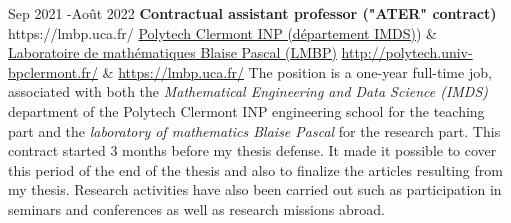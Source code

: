 \documentclass[10pt]{article} %
\begin{document}
\job
{Sep 2021 -}{Août 2022}
{\textbf{Contractual assistant professor ("ATER" contract)}}
{https://lmbp.uca.fr/}
{\href{http://polytech.univ-bpclermont.fr/}{Polytech Clermont INP (département IMDS)}) \&   \href{https://lmbp.uca.fr/}{Laboratoire de mathématiques Blaise Pascal  (LMBP)}}
{\href{http://polytech.univ-bpclermont.fr/}{http://polytech.univ-bpclermont.fr/}     \&   \href{https://lmbp.uca.fr/}{https://lmbp.uca.fr/}  }
{ The position is a one-year full-time job,  associated with both the \textit{Mathematical Engineering and Data Science (IMDS)} department of the Polytech Clermont INP engineering school for the teaching part and the \textit{laboratory of mathematics Blaise Pascal}  for the research part.
	This contract started 3 months before my thesis defense. It made it possible to cover this period of the end of the thesis and also to finalize the articles resulting from my thesis. Research activities have also been carried out such as participation in seminars and conferences as well as research missions abroad.
	}
\end{document}
